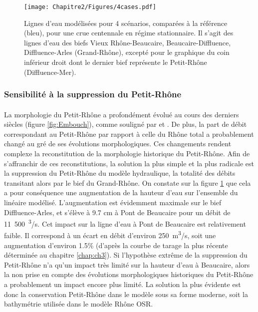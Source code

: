 			
	\begin{figure}[h]
		\centering
		\texttt{[image: Chapitre2/Figures/4cases.pdf]}
        \caption{Lignes d'eau modélisées pour 4 scénarios, comparées à la référence (bleu), pour une crue centennale en régime stationnaire. Il s'agit des lignes d'eau des biefs Vieux Rhône-Beaucaire, Beaucaire-Diffluence, Diffluence-Arles (Grand-Rhône), excepté pour le graphique du coin inférieur droit dont le dernier bief représente le Petit-Rhône (Diffluence-Mer).}
		\label{fig:Sensib4}
	\end{figure}		
		
	\subsubsection{Sensibilité à la suppression du Petit-Rhône} 
	
	\paragraph{} La morphologie du Petit-Rhône a profondément évolué au cours des derniers siècles (figure \ref{fig:Embouch}), comme souligné par \citet{pichard_les_2014} et \citet{raccasi_mutations_2008}. De plus, la part de débit correspondant au Petit-Rhône par rapport à celle du Rhône total a probablement changé au gré de ses évolutions morphologiques. Ces changements rendent complexe la reconstitution de la morphologie historique du Petit-Rhône. Afin de s'affranchir de ces reconstitutions, la solution la plus simple et la plus radicale est la suppression du Petit-Rhône du modèle hydraulique, la totalité des débits transitant alors par le bief du Grand-Rhône. On constate sur la figure \ref{fig:Sensib4} que cela a pour conséquence une augmentation de la hauteur d'eau sur l'ensemble du linéaire modélisé. L'augmentation est évidemment maximale sur le bief Diffluence-Arles, et s'élève à 9.7 cm à Pont de Beaucaire pour un débit de 11~500~\textsuperscript{3}/s. Cet impact sur la ligne d'eau à Pont de Beaucaire est relativement faible. Il correspond à un écart en débit d'environ 250~m\textsuperscript{3}/s, soit une augmentation d'environ 1.5\% (d'après la courbe de tarage la plus récente déterminée au chapitre \ref{chap:ch3}). Si l'hypothèse extrême de la suppression du Petit-Rhône n'a qu'un impact très limité sur la hauteur d'eau à Beaucaire, alors la non prise en compte des évolutions morphologiques historiques du Petit-Rhône a probablement un impact encore plus limité. La solution la plus évidente est donc la conservation Petit-Rhône dans le modèle sous sa forme moderne, soit la bathymétrie utilisée dans le modèle Rhône OSR.
	
